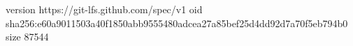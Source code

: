 version https://git-lfs.github.com/spec/v1
oid sha256:e60a9011503a40f1850abb9555480adcea27a85bef25d4dd92d7a70f5eb794b0
size 87544
